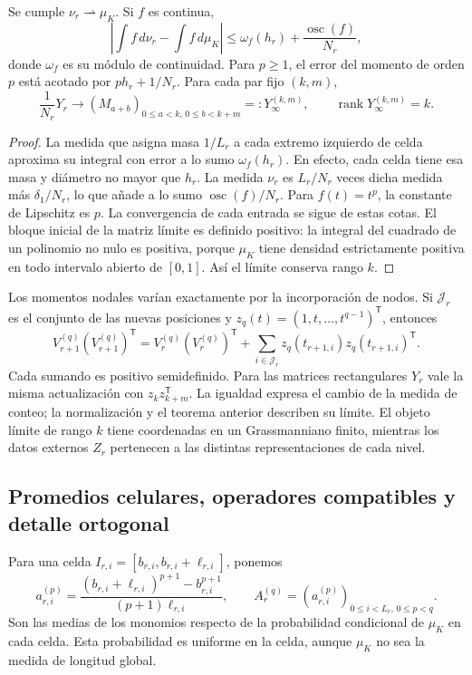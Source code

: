 \begin{theorem}
\label{thm:dim-nodal-limit}
Se cumple \(\nu_r\rightharpoonup\mu_K\). Si \(f\) es continua,
\[
 \left|\int f\,d\nu_r-\int f\,d\mu_K\right|
 \leq \omega_f(h_r)+\frac{\operatorname{osc}(f)}{N_r},
\]
donde \(\omega_f\) es su módulo de continuidad. Para \(p\geq1\),
el error del momento de orden \(p\) está acotado por
\(p h_r+1/N_r\). Para cada par fijo \((k,m)\),
\[
 \frac1{N_r}Y_r\longrightarrow (M_{a+b})_{
     0\leq a<k,\,0\leq b<k+m}=:Y_\infty^{(k,m)},
 \qquad\operatorname{rank}Y_\infty^{(k,m)}=k.
\]
\end{theorem}
\begin{proof}
La medida que asigna masa \(1/L_r\) a cada extremo izquierdo de
celda aproxima su integral con error a lo sumo \(\omega_f(h_r)\).
En efecto, cada celda tiene esa masa y diámetro no mayor que \(h_r\).
La medida \(\nu_r\) es \(L_r/N_r\) veces dicha medida más
\(\delta_1/N_r\), lo que añade a lo sumo
\(\operatorname{osc}(f)/N_r\). Para \(f(t)=t^p\), la constante
de Lipschitz es \(p\). La convergencia de cada entrada se sigue de
estas cotas. El bloque inicial de la matriz límite es definido positivo:
la integral del cuadrado de un polinomio no nulo es positiva, porque
\(\mu_K\) tiene densidad estrictamente positiva en todo intervalo
abierto de \([0,1]\). Así el límite conserva rango \(k\).
\end{proof}

Los momentos nodales varían exactamente por la incorporación de nodos.
Si \(\mathcal J_r\) es el conjunto de las nuevas posiciones y
\(z_q(t)=(1,t,\ldots,t^{q-1})^{\mathsf T}\), entonces
\[
 V_{r+1}^{(q)}(V_{r+1}^{(q)})^{\mathsf T}
 =V_r^{(q)}(V_r^{(q)})^{\mathsf T}
  +\sum_{i\in\mathcal J_r}z_q(t_{r+1,i})z_q(t_{r+1,i})^{\mathsf T}.
\]
Cada sumando es positivo semidefinido. Para las matrices rectangulares
\(Y_r\) vale la misma actualización con
\(z_kz_{k+m}^{\mathsf T}\). La igualdad expresa el cambio de la
medida de conteo; la normalización y el teorema anterior describen su
límite. El objeto límite de rango \(k\) tiene coordenadas en un
Grassmanniano finito, mientras los datos externos \(Z_r\) pertenecen
a las distintas representaciones de cada nivel.

\subsection{Promedios celulares, operadores compatibles y detalle ortogonal}

Para una celda \(I_{r,i}=[b_{r,i},b_{r,i}+\ell_{r,i}]\), ponemos
\[
 a_{r,i}^{(p)}=
 \frac{(b_{r,i}+\ell_{r,i})^{p+1}-b_{r,i}^{p+1}}
 {(p+1)\ell_{r,i}},\qquad
 A_r^{(q)}=(a_{r,i}^{(p)})_{0\leq i<L_r,\,0\leq p<q}.
\]
Son las medias de los monomios respecto de la probabilidad condicional
de \(\mu_K\) en cada celda. Esta probabilidad es uniforme en la
celda, aunque \(\mu_K\) no sea la medida de longitud global.


